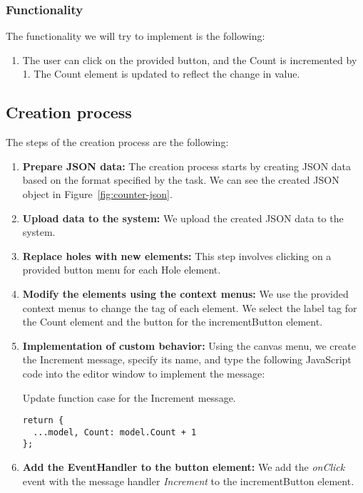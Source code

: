 \subsubsection{Functionality}
The functionality we will try to implement is the following:
\begin{enumerate}
	\item The user can click on the provided button, and the Count is incremented by 1. The Count element is updated to reflect the change in value.
\end{enumerate}
\medskip
\subsection {Creation process}

The steps of the creation process are the following:
\begin{enumerate}
	\item \textbf{Prepare JSON data:} The creation process starts by creating JSON data based on the format specified by the task.
	      We can see the created JSON object in Figure~\ref{fig:counter-json}.
	\item \textbf{Upload data to the system:} We upload the created JSON data to the system.
	\item \textbf{Replace holes with new elements:} This step involves clicking on a provided button menu for each Hole element.
	\item \textbf{Modify the elements using the context menus:} We use the provided context menus to change the tag of each element.
	      We select the label tag for the Count element and the button for the incrementButton element.
	\item \textbf{Implementation of custom behavior:} Using the canvas menu, we create the Increment message, specify its name, and type the following JavaScript code into the editor window to implement the message:
	      \begin{listing}[htbp]
		      \caption{Update function case for the Increment message.}
		      \begin{lstlisting}
return {
  ...model, Count: model.Count + 1
};
            \end{lstlisting}
	      \end{listing}
	\item \textbf{Add the EventHandler to the button element:} We add the \emph{onClick} event with the message handler \emph{Increment} to the incrementButton element.
\end{enumerate}


